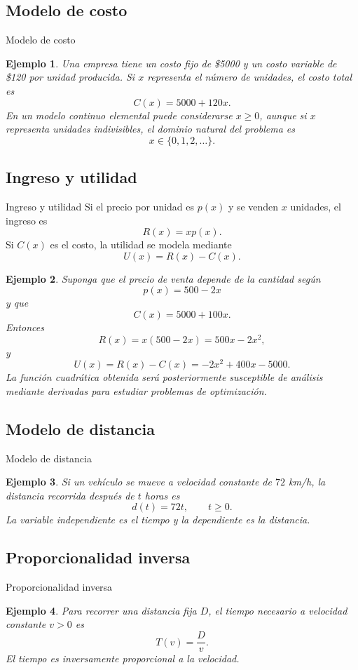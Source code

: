 \documentclass[aspectratio=169,10pt]{beamer}
\newtheorem{ejemplo}{Ejemplo}
\begin{document}
\subsection{Modelo de costo}
\begin{frame}{Modelo de costo}
\begin{ejemplo}
Una empresa tiene un costo fijo de \$5000 y un costo variable de \$120 por
unidad producida. Si $x$ representa el número de unidades, el costo total es
\[
C(x)=5000+120x.
\]
En un modelo continuo elemental puede considerarse $x\geq0$, aunque si $x$
representa unidades indivisibles, el dominio natural del problema es
\[
x\in\{0,1,2,\ldots\}.
\]
\end{ejemplo}
\end{frame}
\subsection{Ingreso y utilidad}
\begin{frame}{Ingreso y utilidad}
Si el precio por unidad es $p(x)$ y se venden $x$ unidades, el ingreso es
\[
R(x)=xp(x).
\]
Si $C(x)$ es el costo, la utilidad se modela mediante
\[
U(x)=R(x)-C(x).
\]

\begin{ejemplo}
Suponga que el precio de venta depende de la cantidad según
\[
p(x)=500-2x
\]
y que
\[
C(x)=5000+100x.
\]
Entonces
\[
R(x)=x(500-2x)=500x-2x^2,
\]
y
\[
U(x)=R(x)-C(x)
=-2x^2+400x-5000.
\]
La función cuadrática obtenida será posteriormente susceptible de análisis
mediante derivadas para estudiar problemas de optimización.
\end{ejemplo}
\end{frame}
\subsection{Modelo de distancia}
\begin{frame}{Modelo de distancia}
\begin{ejemplo}
Si un vehículo se mueve a velocidad constante de $72$ km/h, la distancia
recorrida después de $t$ horas es
\[
d(t)=72t,\qquad t\geq0.
\]
La variable independiente es el tiempo y la dependiente es la distancia.
\end{ejemplo}
\end{frame}
\subsection{Proporcionalidad inversa}
\begin{frame}{Proporcionalidad inversa}
\begin{ejemplo}
Para recorrer una distancia fija $D$, el tiempo necesario a velocidad constante
$v>0$ es
\[
T(v)=\frac{D}{v}.
\]
El tiempo es inversamente proporcional a la velocidad.
\end{ejemplo}
\end{frame}
\end{document}
